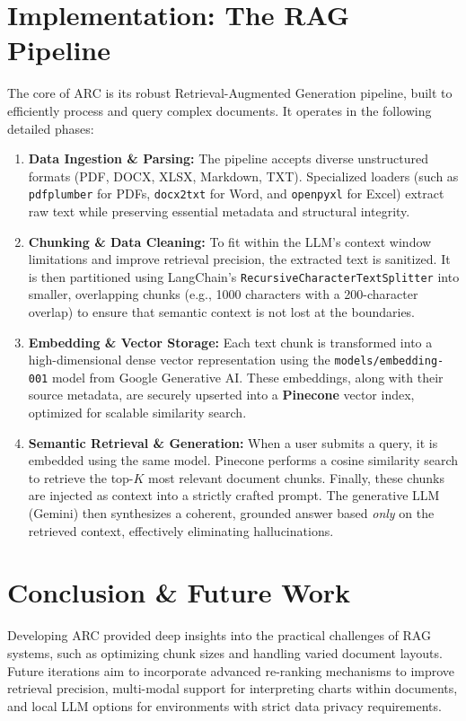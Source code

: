 \documentclass[10pt, a4paper]{article}
\begin{document}
\section{Implementation: The RAG Pipeline}
The core of ARC is its robust Retrieval-Augmented Generation pipeline, built to efficiently process and query complex documents. It operates in the following detailed phases:
\begin{enumerate}[nosep, leftmargin=*]
    \item \textbf{Data Ingestion \& Parsing:} The pipeline accepts diverse unstructured formats (PDF, DOCX, XLSX, Markdown, TXT). Specialized loaders (such as \texttt{pdfplumber} for PDFs, \texttt{docx2txt} for Word, and \texttt{openpyxl} for Excel) extract raw text while preserving essential metadata and structural integrity.
    \item \textbf{Chunking \& Data Cleaning:} To fit within the LLM's context window limitations and improve retrieval precision, the extracted text is sanitized. It is then partitioned using LangChain's \texttt{RecursiveCharacterTextSplitter} into smaller, overlapping chunks (e.g., 1000 characters with a 200-character overlap) to ensure that semantic context is not lost at the boundaries.
    \item \textbf{Embedding \& Vector Storage:} Each text chunk is transformed into a high-dimensional dense vector representation using the \texttt{models/embedding-001} model from Google Generative AI. These embeddings, along with their source metadata, are securely upserted into a \textbf{Pinecone} vector index, optimized for scalable similarity search.
    \item \textbf{Semantic Retrieval \& Generation:} When a user submits a query, it is embedded using the same model. Pinecone performs a cosine similarity search to retrieve the top-$K$ most relevant document chunks. Finally, these chunks are injected as context into a strictly crafted prompt. The generative LLM (Gemini) then synthesizes a coherent, grounded answer based \textit{only} on the retrieved context, effectively eliminating hallucinations.
\end{enumerate}

\section{Conclusion \& Future Work}
Developing ARC provided deep insights into the practical challenges of RAG systems, such as optimizing chunk sizes and handling varied document layouts. Future iterations aim to incorporate advanced re-ranking mechanisms to improve retrieval precision, multi-modal support for interpreting charts within documents, and local LLM options for environments with strict data privacy requirements.
\end{document}
